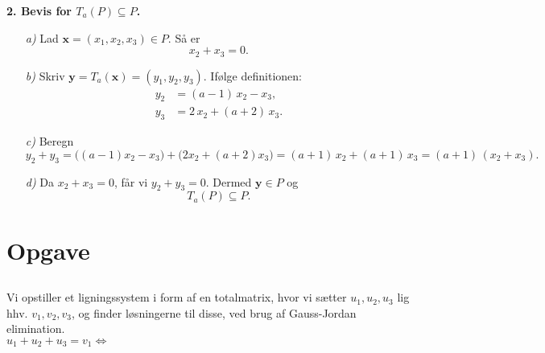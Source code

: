 \documentclass[a4paper,12pt]{article}
\begin{document}
\bigskip

\noindent\textbf{2. Bevis for \(T_a(P)\subseteq P\).}
\begin{itemize}
  \item[\emph{a)}] Lad \(\mathbf x=(x_1,x_2,x_3)\in P\). Så er
  \[
    x_2 + x_3 = 0.
  \]
  \item[\emph{b)}] Skriv \(\mathbf y = T_a(\mathbf x) = (y_1,y_2,y_3)\). Ifølge definitionen:
  \[
    \begin{aligned}
      y_2 &= (a-1)\,x_2 - x_3,\\
      y_3 &= 2\,x_2 + (a+2)\,x_3.
    \end{aligned}
  \]
  \item[\emph{c)}] Beregn
  \[
    y_2 + y_3
    = \bigl((a-1)x_2 - x_3\bigr) + \bigl(2x_2 + (a+2)x_3\bigr)
    = (a+1)\,x_2 + (a+1)\,x_3
    = (a+1)\,(x_2 + x_3).
  \]
  \item[\emph{d)}] Da \(x_2 + x_3=0\), får vi \(y_2 + y_3 = 0\). Dermed
  \(\mathbf y\in P\) og
  \[
    T_a(P)\subseteq P.
  \]
\end{itemize}




\section[Opgave]{Opgave}
\subsection{}
Vi opstiller et ligningssystem i form af en totalmatrix, hvor vi sætter $u_1, u_2, u_3$ lig hhv. $v_1, v_2, v_3$, og finder løsningerne til disse, ved brug af Gauss-Jordan elimination.\\

$u_1 + u_2 + u_3 = v_1 \Leftrightarrow$\\
\end{document}
